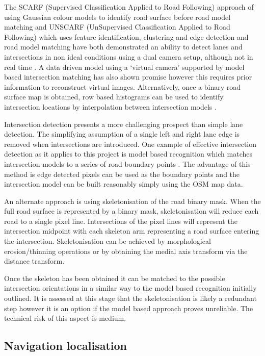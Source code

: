 \documentclass[]{aiaa-tc}%
\begin{document}
The SCARF (Supervised Classification Applied to Road Following) approach of using Gaussian colour models to identify road surface before road model matching \citep{scarf} and UNSCARF (UnSupervised Classification Applied to Road Following) which uses feature identification, clustering and edge detection and road model matching \citep{unscarf} have both demonstrated an ability to detect lanes and intersections in non ideal conditions using a dual camera setup, although not in real time \citep{scarfAndUnscarfPresented}. A data driven model using a `virtual camera' supported by model based intersection matching has also shown promise \citep{alvinnVC} however this requires prior information to reconstruct virtual images. Alternatively, once a binary road surface map is obtained, row based histograms can be used to identify intersection locations by interpolation between intersection models \citep{intersectionDetectionSingleCamera}.

Intersection detection presents a more challenging prospect than simple lane detection. The simplifying assumption of a single left and right lane edge is removed when intersections are introduced. One example of effective intersection detection as it applies to this project is model based recognition which matches intersection models to a series of road boundary points \citep{modelBasedIntersection}. The advantage of this method is edge detected pixels can be used as the boundary points and the intersection model can be built reasonably simply using the OSM map data.

An alternate approach is using skeletonisation of the road binary mask. When the full road surface is represented by a binary mask, skeletonisation will reduce each road to a single pixel line. Intersections of the pixel lines will represent the intersection midpoint with each skeleton arm representing a road surface entering the intersection. Skeletonisation can be achieved by morphological erosion/thinning operations or by obtaining the medial axis transform via the distance transform.

Once the skeleton has been obtained it can be matched to the possible intersection orientations in a similar way to the model based recognition initially outlined. It is assessed at this stage that the skeletonisation is likely a redundant step however it is an option if the model based approach proves unreliable. The technical risk of this aspect is medium.


\subsection{Navigation localisation}
\end{document}
